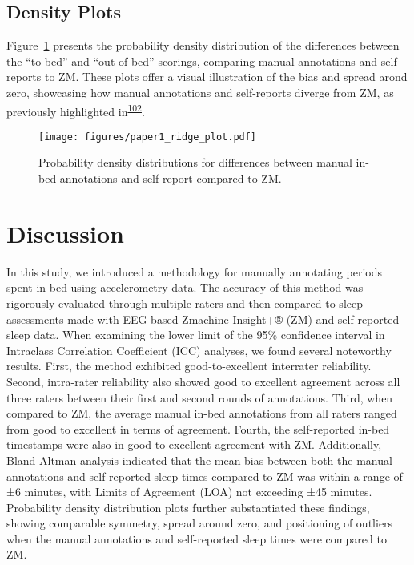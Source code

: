 \documentclass[
  9pt,
]{scrbook}
\begin{document}
\hypertarget{density-plots}{%
\subsection{Density Plots}\label{density-plots}}

Figure~\ref{fig-ridge_plot} presents the probability density
distribution of the differences between the ``to-bed'' and
``out-of-bed'' scorings, comparing manual annotations and self-reports
to ZM. These plots offer a visual illustration of the bias and spread
arond zero, showcasing how manual annotations and self-reports diverge
from ZM, as previously highlighted
in\textsuperscript{\protect\hyperlink{ref-van_hees_estimating_2018}{102}}.

\begin{figure}

{\centering \texttt{[image: figures/paper1\_ridge\_plot.pdf]}

}

\caption{\label{fig-ridge_plot}Probability density distributions for
differences between manual in-bed annotations and self-report compared
to ZM.}

\end{figure}

\hypertarget{discussion}{%
\section{Discussion}\label{discussion}}

In this study, we introduced a methodology for manually annotating
periods spent in bed using accelerometry data. The accuracy of this
method was rigorously evaluated through multiple raters and then
compared to sleep assessments made with EEG-based Zmachine Insight+®
(ZM) and self-reported sleep data. When examining the lower limit of the
95\% confidence interval in Intraclass Correlation Coefficient (ICC)
analyses, we found several noteworthy results. First, the method
exhibited good-to-excellent interrater reliability. Second, intra-rater
reliability also showed good to excellent agreement across all three
raters between their first and second rounds of annotations. Third, when
compared to ZM, the average manual in-bed annotations from all raters
ranged from good to excellent in terms of agreement. Fourth, the
self-reported in-bed timestamps were also in good to excellent agreement
with ZM. Additionally, Bland-Altman analysis indicated that the mean
bias between both the manual annotations and self-reported sleep times
compared to ZM was within a range of ±6 minutes, with Limits of
Agreement (LOA) not exceeding ±45 minutes. Probability density
distribution plots further substantiated these findings, showing
comparable symmetry, spread around zero, and positioning of outliers
when the manual annotations and self-reported sleep times were compared
to ZM.
\end{document}
